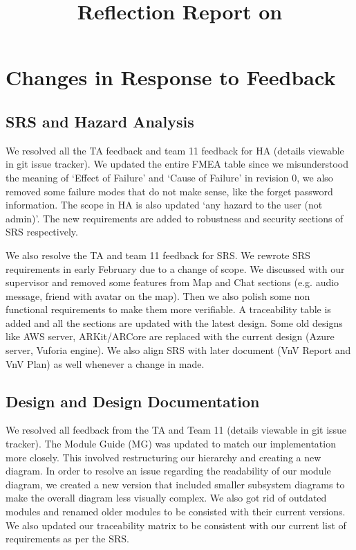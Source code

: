 \documentclass{article}
\title{Reflection Report on \progname}
\author{\authname}
\date{}
\begin{document}
\maketitle

\section{Changes in Response to Feedback}
\subsection{SRS and Hazard Analysis}
We resolved all the TA feedback and team 11 feedback for HA (details viewable in git issue tracker). We updated the entire FMEA table since we misunderstood the meaning of `Effect of Failure' and `Cause of Failure' in revision 0, we also removed some failure modes that do not make sense, like the forget password information. The scope in HA is also updated `any hazard to the user (not admin)'. The new requirements are added to robustness and security sections of SRS respectively.

We also resolve the TA and team 11 feedback for SRS. We rewrote SRS requirements in early February due to a change of scope. We discussed with our supervisor and removed some features from Map and Chat sections (e.g. audio message, friend with avatar on the map). Then we also polish some non functional requirements to make them more verifiable. A traceability table is added and all the sections are updated with the latest design. Some old designs like AWS server, ARKit/ARCore are replaced with the current design (Azure server, Vuforia engine). We also align SRS with later document (VnV Report and VnV Plan) as well whenever a change in made.

\subsection{Design and Design Documentation}
We resolved all feedback from the TA and Team 11 (details viewable in git issue tracker). The Module Guide (MG) was updated to match our implementation more closely. This involved restructuring our hierarchy and creating a new diagram. In order to resolve an issue regarding the readability of our module diagram, we created a new version that included smaller subsystem diagrams to make the overall diagram less visually complex. We also got rid of outdated modules and renamed older modules to be consisted with their current versions. We also updated our traceability matrix to be consistent with our current list of requirements as per the SRS.
\end{document}
